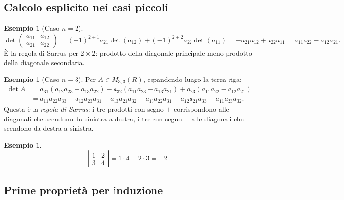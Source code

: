\documentclass[11pt, a4paper]{book}
\theoremstyle{definition}
\newtheorem{esempio}[definizione]{Esempio}
\theoremstyle{plain}
\theoremstyle{remark}
\begin{document}
\subsection{Calcolo esplicito nei casi piccoli}

\begin{exbox}
\begin{esempio}[Caso $n=2$]
\[
  \det\begin{pmatrix} a_{11} & a_{12} \\ a_{21} & a_{22} \end{pmatrix}
  = (-1)^{2+1}a_{21}\det(a_{12}) + (-1)^{2+2}a_{22}\det(a_{11})
  = -a_{21}a_{12} + a_{22}a_{11}
  = a_{11}a_{22} - a_{12}a_{21}.
\]
È la regola di Sarrus per $2\times 2$: prodotto della diagonale principale meno prodotto della diagonale secondaria.
\end{esempio}
\end{exbox}

\begin{exbox}
\begin{esempio}[Caso $n=3$]
\label{es:det3}
Per $A \in M_{3,3}(R)$, espandendo lungo la terza riga:
\begin{align*}
  \det A &= a_{31}(a_{12}a_{23} - a_{13}a_{22}) - a_{32}(a_{11}a_{23} - a_{13}a_{21}) + a_{33}(a_{11}a_{22} - a_{12}a_{21}) \\
         &= a_{11}a_{22}a_{33} + a_{12}a_{23}a_{31} + a_{13}a_{21}a_{32}
            - a_{13}a_{22}a_{31} - a_{12}a_{21}a_{33} - a_{11}a_{23}a_{32}.
\end{align*}
Questa è la \emph{regola di Sarrus}: i tre prodotti con segno $+$ corrispondono alle diagonali che scendono da sinistra a destra, i tre con segno $-$ alle diagonali che scendono da destra a sinistra.
\end{esempio}
\end{exbox}

\begin{exbox}
\begin{esempio}
\[
  \left|\begin{matrix}1&2\\3&4\end{matrix}\right| = 1\cdot4 - 2\cdot3 = -2.
\]
\end{esempio}
\end{exbox}

\subsection{Prime proprietà per induzione}
\end{document}
